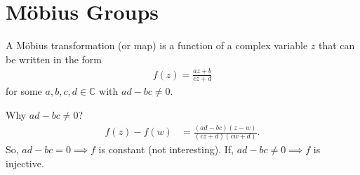 \section{M\"obius Groups}

\begin{definition}
A M\"obius transformation (or map) is a function of a complex variable $z$ that can be written in the form 
\begin{align*}
    f(z) = \frac{az + b}{cz + d}
\end{align*} for some $a, b, c, d \in \mathbb{C}$ with $ad - bc \neq 0$.
\end{definition} 

Why $ad - bc \neq 0$?
\begin{align*}
    f(z) - f(w) &= \frac{(ad - bc)(z - w)}{(cz + d) (cw + d)}.
\end{align*} 
So, $ad - bc = 0 \implies f$ is constant (not interesting).
If,  $ad - bc \neq 0 \implies f$ is injective.


